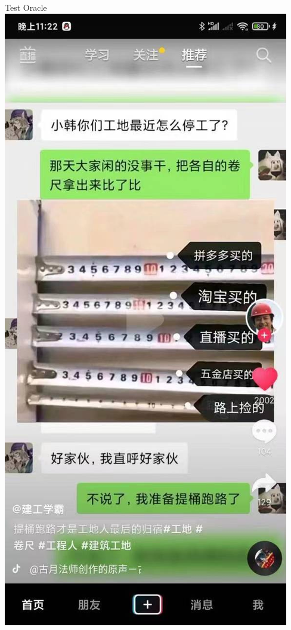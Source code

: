 \documentclass{beamer}
\begin{document}
\begin{frame}[t]{Test Oracle}
    \centering
\includegraphics[width=0.3\linewidth]{images/differential.jpeg} %
\end{frame}
\end{document}
